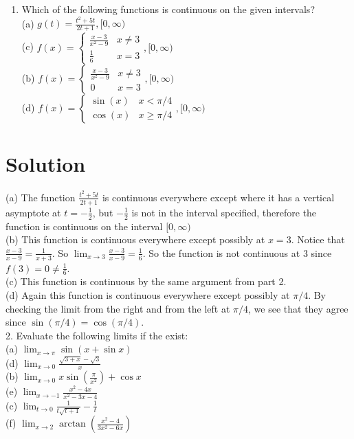 \documentclass[10pt]{article}
\begin{document}
\begin{enumerate}
  \item Which of the following functions is continuous on the given intervals?\\
(a) $g(t)=\frac{t^{2}+5 t}{2 t+1},[0, \infty)$\\
(c) $f(x)=\left\{\begin{array}{ll}\frac{x-3}{x^{2}-9} & x \neq 3 \\ \frac{1}{6} & x=3\end{array},[0, \infty)\right.$\\
(b) $f(x)=\left\{\begin{array}{ll}\frac{x-3}{x^{2}-9} & x \neq 3 \\ 0 & x=3\end{array},[0, \infty)\right.$\\
(d) $f(x)=\left\{\begin{array}{ll}\sin (x) & x<\pi / 4 \\ \cos (x) & x \geq \pi / 4\end{array},[0, \infty)\right.$
\end{enumerate}

\section*{Solution}
(a) The function $\frac{t^{2}+5 t}{2 t+1}$ is continuous everywhere except where it has a vertical asymptote at $t=-\frac{1}{2}$, but $-\frac{1}{2}$ is not in the interval specified, therefore the function is continuous on the interval $[0, \infty)$\\
(b) This function is continuous everywhere except possibly at $x=3$. Notice that $\frac{x-3}{x-9}=\frac{1}{x+3}$. So $\lim _{x \rightarrow 3} \frac{x-3}{x-9}=\frac{1}{6}$. So the function is not continuous at 3 since $f(3)=0 \neq \frac{1}{6}$.\\
(c) This function is continuous by the same argument from part 2.\\
(d) Again this function is continuous everywhere except possibly at $\pi / 4$. By checking the limit from the right and from the left at $\pi / 4$, we see that they agree since $\sin (\pi / 4)=\cos (\pi / 4)$.\\
2. Evaluate the following limits if the exist:\\
(a) $\lim _{x \rightarrow \pi} \sin (x+\sin x)$\\
(d) $\lim _{x \rightarrow 0} \frac{\sqrt{3+x}-\sqrt{3}}{x}$\\
(b) $\lim _{x \rightarrow 0} x \sin \left(\frac{\pi}{x^{2}}\right)+\cos x$\\
(e) $\lim _{x \rightarrow-1} \frac{x^{2}-4 x}{x^{2}-3 x-4}$\\
(c) $\lim _{t \rightarrow 0} \frac{1}{t \sqrt{t+1}}-\frac{1}{t}$\\
(f) $\lim _{x \rightarrow 2} \arctan \left(\frac{x^{2}-4}{3 x^{2}-6 x}\right)$
\end{document}
